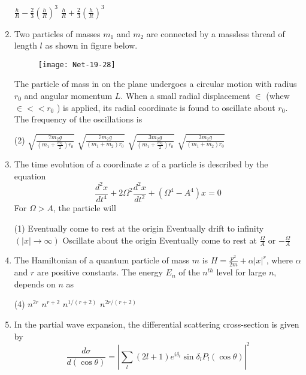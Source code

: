\begin{enumerate}
\begin{tasks}
	\task[\textbf{c.}]$\frac{h}{R}-\frac{2}{3}\left(\frac{h}{R}\right)^{3}$
	\task[\textbf{d.}] $\frac{h}{R}+\frac{2}{3}\left(\frac{h}{R}\right)^{3}$
\end{tasks}
\item Two particles of masses $m_{1}$ and $m_{2}$ are connected by a massless thread of length $l$ as shown in figure below.
\begin{figure}[H]
	\centering
	\texttt{[image: Net-19-28]}
\end{figure}
The particle of mass in on the plane undergoes a circular motion with radius $r_{0}$ and angular momentum $L$. When a small radial displacement $\in$ (whew $\in<<r_{0}$ ) is applied, its radial coordinate is found to oscillate about $r_{0}$. The frequency of the oscillations is
 \begin{tasks}(2)
	\task[\textbf{a.}] $\sqrt{\frac{7 m_{2} g}{\left(m_{1}+\frac{m_{2}}{2}\right) r_{0}}}$
	\task[\textbf{b.}]$\sqrt{\frac{7 m_{2} g}{\left(m_{1}+m_{2}\right) r_{0}}}$
	\task[\textbf{c.}]$\sqrt{\frac{3 m_{2} g}{\left(m_{1}+\frac{m_{2}}{2}\right) r_{0}}}$
	\task[\textbf{d.}] $\sqrt{\frac{3 m_{2} g}{\left(m_{1}+m_{2}\right) r_{0}}}$
\end{tasks}
\item  The time evolution of a coordinate $x$ of a particle is described by the equation
$$
\frac{d^{2} x}{d t^{4}}+2 \Omega^{2} \frac{d^{2} x}{d t^{2}}+\left(\Omega^{4}-A^{4}\right) x=0
$$
For $\Omega>A$, the particle will
 \begin{tasks}(1)
	\task[\textbf{a.}]Eventually come to rest at the origin
	\task[\textbf{b.}] Eventually drift to infinity $(|x| \rightarrow \infty)$
	\task[\textbf{c.}] Oscillate about the origin
	\task[\textbf{d.}] Eventually come to rest at $\frac{\Omega}{A}$ or $-\frac{\Omega}{A}$
\end{tasks}
\item  The Hamiltonian of a quantum particle of mass $m$ is $H=\frac{p^{2}}{2 m}+\alpha|x|^{r}$, where $\alpha$ and $r$ are positive constants. The energy $E_{n}$ of the $n^{t h}$ level for large $n$, depends on $n$ as
 \begin{tasks}(4)
	\task[\textbf{a.}]$n^{2 r}$
	\task[\textbf{b.}]$n^{r+2}$
	\task[\textbf{c.}]$n^{1 /(r+2)}$
	\task[\textbf{d.}] $n^{2 r /(r+2)}$
\end{tasks}
\item In the partial wave expansion, the differential scattering cross-section is given by
$$
\frac{d \sigma}{d(\cos \theta)}=\left|\sum_{l}(2 l+1) e^{i \delta_{i}} \sin \delta_{l} P_{l}(\cos \theta)\right|^{2}
$$
\end{enumerate}
